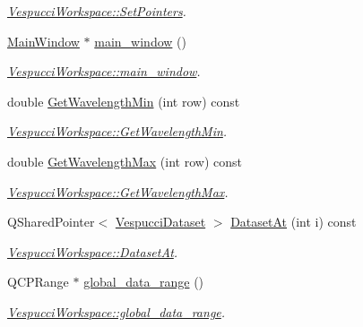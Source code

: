 \begin{DoxyCompactItemize}
\begin{DoxyCompactList}\small\item\em \hyperlink{class_vespucci_workspace_a76edf2cc6e068dfe8af74e8fdd89d33b}{Vespucci\+Workspace\+::\+Set\+Pointers}. \end{DoxyCompactList}\item 
\hyperlink{class_main_window}{Main\+Window} $\ast$ \hyperlink{class_vespucci_workspace_a48a0bc8ab860ca6a66e7eaf9b803b78a}{main\+\_\+window} ()
\begin{DoxyCompactList}\small\item\em \hyperlink{class_vespucci_workspace_a48a0bc8ab860ca6a66e7eaf9b803b78a}{Vespucci\+Workspace\+::main\+\_\+window}. \end{DoxyCompactList}\item 
double \hyperlink{class_vespucci_workspace_a717025c8cf124cc277398d7c591dc539}{Get\+Wavelength\+Min} (int row) const 
\begin{DoxyCompactList}\small\item\em \hyperlink{class_vespucci_workspace_a717025c8cf124cc277398d7c591dc539}{Vespucci\+Workspace\+::\+Get\+Wavelength\+Min}. \end{DoxyCompactList}\item 
double \hyperlink{class_vespucci_workspace_a63febc7833df93157680bb1cc3257063}{Get\+Wavelength\+Max} (int row) const 
\begin{DoxyCompactList}\small\item\em \hyperlink{class_vespucci_workspace_a63febc7833df93157680bb1cc3257063}{Vespucci\+Workspace\+::\+Get\+Wavelength\+Max}. \end{DoxyCompactList}\item 
Q\+Shared\+Pointer$<$ \hyperlink{class_vespucci_dataset}{Vespucci\+Dataset} $>$ \hyperlink{class_vespucci_workspace_acbd06aa3670264e609c62e730ec1114f}{Dataset\+At} (int i) const 
\begin{DoxyCompactList}\small\item\em \hyperlink{class_vespucci_workspace_acbd06aa3670264e609c62e730ec1114f}{Vespucci\+Workspace\+::\+Dataset\+At}. \end{DoxyCompactList}\item 
Q\+C\+P\+Range $\ast$ \hyperlink{class_vespucci_workspace_abaf4eecf7d203d86576483384280fe7e}{global\+\_\+data\+\_\+range} ()
\begin{DoxyCompactList}\small\item\em \hyperlink{class_vespucci_workspace_abaf4eecf7d203d86576483384280fe7e}{Vespucci\+Workspace\+::global\+\_\+data\+\_\+range}. \end{DoxyCompactList}\item 

\end{DoxyCompactItemize}
